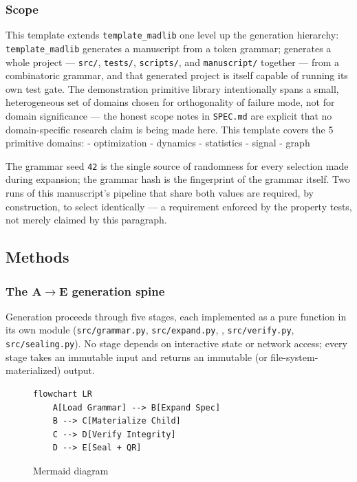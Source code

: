 \documentclass[
]{article}
\begin{document}
\subsubsection{Scope}\label{scope}

This template extends \texttt{template\_madlib} one level up the
generation hierarchy: \texttt{template\_madlib} generates a manuscript
from a token grammar;  generates a whole
project --- \texttt{src/}, \texttt{tests/}, \texttt{scripts/}, and
\texttt{manuscript/} together --- from a combinatoric grammar, and that
generated project is itself capable of running its own test gate. The
demonstration primitive library intentionally spans a small,
heterogeneous set of domains chosen for orthogonality of failure mode,
not for domain significance --- the honest scope notes in
\texttt{SPEC.md} are explicit that no domain-specific research claim is
being made here. This template covers the 5 primitive domains: -
optimization - dynamics - statistics - signal - graph

The grammar seed \texttt{42} is the single source of randomness for
every selection made during expansion; the grammar hash
 is the fingerprint of the grammar itself. Two
runs of this manuscript's pipeline that share both values are required,
by construction, to select identically --- a requirement enforced by the
property tests, not merely claimed by this paragraph.

\newpage

\subsection{Methods}\label{methods}

\subsubsection{The A\texorpdfstring{\ensuremath{\to}}{->}E generation spine}\label{the-ae-generation-spine}

Generation proceeds through five stages, each implemented as a pure
function in its own module (\texttt{src/grammar.py},
\texttt{src/expand.py}, ,
\texttt{src/verify.py}, \texttt{src/sealing.py}). No stage depends on
interactive state or network access; every stage takes an immutable
input and returns an immutable (or file-system-materialized) output.

\begin{figure}[htbp]
\centering
\begin{verbatim}
flowchart LR
    A[Load Grammar] --> B[Expand Spec]
    B --> C[Materialize Child]
    C --> D[Verify Integrity]
    D --> E[Seal + QR]
\end{verbatim}
\caption{Mermaid diagram}
\end{figure}
\end{document}
